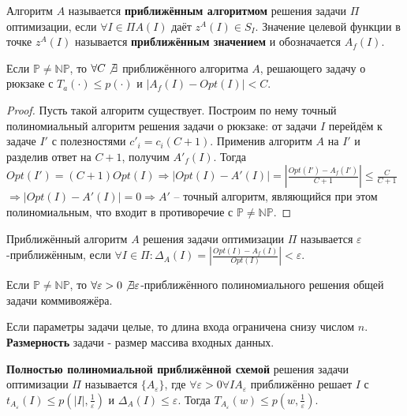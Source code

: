 \documentclass[11pt]{article}
\newcounter{th}\setcounter{th}{0}
\newcounter{stnmt}\setcounter{stnmt}{0}
\def\st{\par\smallskip\refstepcounter{stnmt}\textbf{\arabic{stnmt}}}
\newtheorem*{Statement}{Утверждение \st}
\begin{document}
Алгоритм \(A\) называется \textbf{приближённым алгоритмом} решения задачи \(\Pi\) оптимизации, если
\(\forall I \in \Pi A(I) \text{ даёт } z^A(I) \in S_I\). Значение целевой функции в точке \(z^A(I)\)
называется \textbf{приближённым значением} и обозначается \(A_f(I)\).
\begin{Statement}
Если $\mathbb{P} \neq \mathbb{NP}$, то $\forall C \not\exists$ приближённого алгоритма $A$,
решающего задачу о рюкзаке с $T_a(\cdot) \leq p(\cdot)$ и $|A_f(I) - Opt(I)| < C$.
\end{Statement}
\begin{proof}
Пусть такой алгоритм существует. Построим по нему точный полиномиальный алгоритм решения
задачи о рюкзаке: от задачи $I$ перейдём к задаче $I'$ с полезностями $c'_i = c_i(C + 1)$.
Применив алгоритм $A$ на $I'$ и разделив ответ на $C + 1$, получим $A'_f(I)$. Тогда
$Opt(I') = (C + 1)Opt(I) \Rightarrow |Opt(I) - A'(I)| = |\frac{Opt(I') - A_f(I')}{C + 1}| \leq \frac{C}{C + 1}$
$\Rightarrow |Opt(I) - A'(I)| = 0 \Rightarrow A'$ -- точный алгоритм, являющийся при этом
полиномиальным, что входит в противоречие с $\mathbb{P} \neq \mathbb{NP}$.
\end{proof}
Приближённый алгоритм \(A\) решения задачи оптимизации \(\Pi\) называется \(\varepsilon\)-приближённым,
если \(\forall I \in \Pi: \Delta_A(I) = |\frac{Opt(I) - A_f(I)}{Opt(I)}| < \varepsilon\).
\begin{Statement}
Если $\mathbb{P} \neq \mathbb{NP}$, то $\forall \varepsilon > 0 \not\exists \varepsilon$-приближённого
полиномиального решения общей задачи коммивояжёра.
\end{Statement}
Если параметры задачи целые, то длина входа ограничена снизу числом $n$.
\textbf{Размерность} задачи - размер массива входных данных.

\textbf{Полностью полиномиальной приближённой схемой} решения задачи оптимизации $\Pi$ называется
$\{A_{\varepsilon}\}$, где $\forall \varepsilon > 0 \forall I A_{\varepsilon}$ приближённо решает
$I$ с $t_{A_{\varepsilon}}(I) \leq p(|I|, \frac1{\varepsilon})$ и $\Delta_A(I) \leq \varepsilon$.
Тогда $T_{A_{\varepsilon}}(w) \leq p(w, \frac1{\varepsilon})$.
\end{document}
